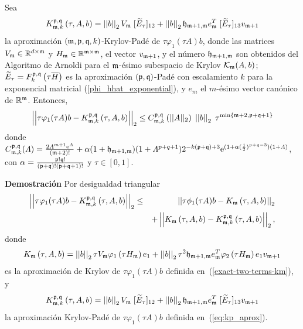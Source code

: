 \begin{theorem}\cite{naranjo2021locally}\label{theorem:Krylov-bound}
	Sea
	\begin{equation} \label{eq:gen_kp_aprox}
	K_{\mathfrak{m},k}^{\mathfrak{p},\mathfrak{q}}\left(\tau, A , b \right)=\left\lvert \left\lvert b \right\rvert \right\rvert_2 V_{\mathfrak{m}}\;[\widetilde{E}_{\tau}]_{12} + \left\lvert \left\lvert b \right\rvert \right\rvert_2 \mathfrak{h}_{\mathfrak{m}+1,\mathfrak{m}}e_{\mathfrak{m}}^T\;[\widetilde{E}_{\tau}]_{13} v_{\mathfrak{m}+1}
	\end{equation}
	la aproximación $(\mathfrak{m} , \mathfrak{p} ,\mathfrak{q} , k)$-Krylov-Padé de $\tau \varphi_1(\tau A)b$, donde las matrices $V_{\mathfrak{m}}\in\mathbb{R}^{d\times \mathfrak{m}}$ y $H_{\mathfrak{m}}\in\mathbb{R}^{{\mathfrak{m}} \times {\mathfrak{m}}}$, el vector $v_{\mathfrak{m}+1}$, y el número $\mathfrak{h}_{\mathfrak{m}+1,\mathfrak{m}}$ son obtenidos del Algoritmo de Arnoldi para el $\mathfrak{m}$-ésimo subespacio de Krylov $\mathcal{K}_{\mathfrak{m}}(A,b)$;  $\widetilde{E}_{\tau}=F_k^{\mathfrak{p},\mathfrak{q}}\left(\tau\overline{H}\right)$ es la aproximación $(\mathfrak{p},\mathfrak{q})$-Padé con escalamiento $k$ para la exponencial matricial (\ref{phi_hhat_exponential}), y $e_m$ el $m$-ésimo vector canónico de $\mathbb{R}^{\mathfrak{m}}$.
	Entonces,
	\begin{equation}
	\left\lvert\left\lvert  \tau \varphi_1(\tau A)b -
	K_{\mf,k}^{\pf,\qf}\left( \tau, A , b \right)\right\rvert\right\rvert_2%
	\leq C_{\mf,k}^{\pf,\qf}\left(\lvert\lvert A \rvert\rvert_2\right) \;
	\nnorm{\nnorm{b}}_2 \; \tau^{\mathrm{min}\left\{ \mf+2,\pf+\qf+1 \right\}}
	\end{equation}
	donde $C_{\mathfrak{m},k}^{\mathfrak{p},\mathfrak{q}}(\varLambda)= \frac{2 \varLambda^{m+1} \mathrm{e}^{\varLambda}}{(\mathfrak{m}+2)!}+
	\alpha (1+\mathfrak{h}_{\mathfrak{m}+1,\mathfrak{m}}) (1+\varLambda^{p+q+1}) 2^{-k(\mathfrak{p}+\mathfrak{q})+3}\mathrm{e}^{(1+\alpha(\frac{1}{2})^{\mathfrak{p}+\mathfrak{q}-3})(1+\varLambda)} $,
	con $\alpha=\frac{\mathfrak{p}!\mathfrak{q}!}{(\mathfrak{p}+\mathfrak{q})!(\mathfrak{p}+\mathfrak{q}+1)!}$ y $\tau \in [0,1]$.
\end{theorem}
\textbf{Demostración} Por desigualdad triangular
\begin{eqnarray} \label{importatdeq}
\left\lvert\left\lvert  \tau \varphi_1(\tau A)b -
K_{\mathfrak{m},k}^{\mathfrak{p},\mathfrak{q}}\left( \tau , A , b \right)\right\rvert\right\rvert_2
& \leq & \left\lvert\left\lvert \tau \phi_1(\tau A)b -  K_{\mathfrak{m}}\left( \tau , A , b \right) \right\rvert\right\rvert_2 \\
& & + \left\lvert\left\lvert  K_{\mathfrak{m}}\left( \tau , A , b \right) -
K_{\mathfrak{m},k}^{\mathfrak{p},\mathfrak{q}}\left( \tau, A , b \right)\right\rvert\right\rvert_2, \nonumber
\end{eqnarray}
donde
\begin{equation*}
K_{\mathfrak{m}}\left(\tau,A , b \right)=\left\lvert \left\lvert b \right\rvert \right\rvert_2 \tau V_{\mathfrak{m}}\varphi_1\left( \tau H_{\mathfrak{m}} \right) e_1 + \left\lvert \left\lvert b \right\rvert \right\rvert_2 \tau^{2}\mathfrak{h}_{\mathfrak{m}+1,\mathfrak{m}}e_{\mathfrak{m}}^T\varphi_2\left(\tau H_{\mathfrak{m}}\right) e_1 v_{\mathfrak{m}+1}
\end{equation*}
es la aproximación de Krylov de $\tau \varphi_1(\tau A)b$ definida en~(\ref{exact-two-terms-km}), y
\begin{equation*}
K_{\mathfrak{m},k}^{\mathfrak{p},\mathfrak{q}}\left(\tau, A , b \right)=\left\lvert \left\lvert b \right\rvert \right\rvert_2 V_{\mathfrak{m}}\;[\widetilde{E}_{\tau}]_{12} + \left\lvert \left\lvert b \right\rvert \right\rvert_2 \mathfrak{h}_{\mathfrak{m}+1,\mathfrak{m}}e_{\mathfrak{m}}^T\;[\widetilde{E}_{\tau}]_{13} v_{\mathfrak{m}+1}
\end{equation*}
la aproximación Krylov-Padé de $\tau \varphi_1(\tau A)b$ definida en~(\ref{eq:kp_aprox}).

